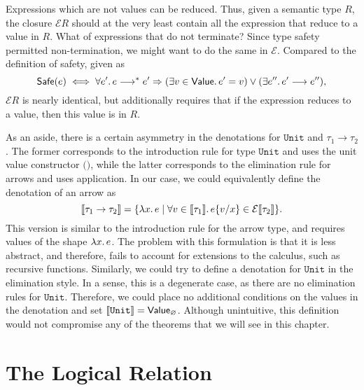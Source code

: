 Expressions which are not values can be reduced.
Thus, given a semantic type $R$, the closure $\mathcal{E} R$
should at the very least contain all the expression that reduce
to a value in $R$. What of expressions that do not terminate? Since
type safety permitted non-termination, we might want to do the same in
$\mathcal{E}$.
Compared to the definition of safety, given as
\[
  \mathsf{Safe}(e) \iff
  \forall e'\ldotp e \longrightarrow^* e'
    \Rightarrow (\exists v \in \mathsf{Value}\ldotp e'=v) \lor
      (\exists e'' \ldotp e'\longrightarrow e''),
\]
$\mathcal{E} R$ is nearly identical, but additionally requires that if the
expression reduces to a value, then this value is in $R$.

As an aside, there is a certain asymmetry in the denotations for
$\texttt{Unit}$ and $\tau_1\to\tau_2$. The former corresponds to the
introduction rule for type $\texttt{Unit}$ and uses the unit value constructor
$\texttt{()}$, while the latter corresponds to the elimination rule for
arrows and uses application.
In our case, we could equivalently define the denotation of an arrow as
\[
  \llbracket\tau_1 \to \tau_2\rrbracket = \{ \lambda x\ldotp e \mid
  \forall v \in \llbracket\tau_1\rrbracket\ldotp
    e\{v/x\} \in \mathcal{E}\llbracket\tau_2\rrbracket \}.
\]
This version is similar to the introduction rule for the arrow type, and
requires values of the shape $\lambda x\ldotp e$. The problem with this
formulation is that it is less abstract, and therefore, fails to account for
extensions to the calculus, such as recursive functions. Similarly, we could
try to define a denotation for $\texttt{Unit}$ in the elimination style.
In a sense, this is a degenerate case, as there are no elimination rules for
$\texttt{Unit}$. Therefore, we could place no additional conditions on the
values in the denotation and set
$\llbracket\texttt{Unit}\rrbracket = \mathsf{Value}_{\varnothing}$. Although
unintuitive, this definition would not compromise any of the theorems
that we will see in this chapter.

\section{The Logical Relation}

